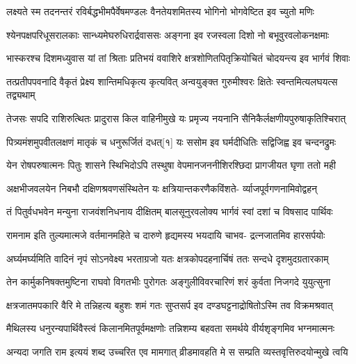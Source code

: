 \twolineshloka
{लक्ष्यते स्म तदनन्तरं रविर्बद्धभीमपैर्वेषमण्डलः}
{वैनतेयशमितस्य भोगिनो भोगवेष्टित इव च्युतो मणिः} %

\fourlineindentedshloka
{श्येनपक्षपरिधूसरालकाः}
{सान्ध्यमेघरुधिरार्द्रवाससः}
{अङ्गना इव रजस्वला दिशो}
{नो बभूवुरवलोकनक्षमाः} %

\fourlineindentedshloka
{भास्करश्च दिशमध्युवास यां}
{तां श्रिताः प्रतिभयं ववाशिरे}
{क्षत्रशोणितपितृक्रियोचितं}
{चोदयन्त्य इव भार्गवं शिवाः} %

\twolineshloka
{तत्प्रतीपपवनादि वैकृतं प्रेक्ष्य शान्तिमधिकृत्य कृत्यवित्}
{अन्वयुङ्क्त गुरुमीश्वरः क्षितेः स्वन्तमित्यलघयत्स तद्व्यथाम्} %

\twolineshloka
{तेजसः सपदि राशिरुत्थितः प्रादुरास किल वाहिनीमुखे}
{यः प्रमृज्य नयनानि सैनिकैर्लक्षणीयपुरुषाकृतिश्चिरात्} %

\twolineshloka
{पित्र्यमंशमुपवीतलक्षणं मातृकं च धनुरूर्जितं दधत्[१]}
{यः ससोम इव घर्मदीधितिः सद्विजिह्व इव चन्दनद्रुमः} %

\twolineshloka
{येन रोषपरुषात्मनः पितुः शासने स्थिभिदोऽपि तस्थुषा}
{वेपमानजननीशिरश्छिदा प्रागजीयत घृणा ततो मही} %

\fourlineindentedshloka
{अक्षभीजवलयेन निबभौ}
{दक्षिणश्रवणसंस्थितेन यः}
{क्षत्रियान्तकरणैकविंशते-}
{र्व्याजपूर्वगणनामिवोद्वहन्} %

\fourlineindentedshloka
{तं पितुर्वधभवेन मन्युना}
{राजवंशनिधनाय दीक्षितम्}
{बालसूनुरवलोक्य भार्गवं}
{स्वां दशां च विषसाद पार्थिवः} %

\fourlineindentedshloka
{रामनाम इति तुल्यमात्मजे}
{वर्तमानमहिते च दारुणे}
{हृद्यमस्य भयदायि चाभव-}
{द्रत्नजातमिव हारसर्पयोः} %

\fourlineindentedshloka
{अर्घ्यमर्घ्यमिति वादिनं नृपं}
{सोऽनवेक्ष्य भरताग्रजो यतः}
{क्षत्रकोपदहनार्चिषं ततः}
{सन्दधे दृशमुदग्रतारकाम्} %

\fourlineindentedshloka
{तेन कार्मुकनिषक्तमुष्टिना}
{राघवो विगतभीः पुरोगतः}
{अङ्गुलीविवरचारिणं शरं}
{कुर्वता निजगदे युयुत्सुना} %

\twolineshloka
{क्षत्रजातमपकारि वैरि मे तन्निहत्य बहुशः शमं गतः}
{सुप्तसर्प इव दण्डघट्टनाद्रोषितोऽस्मि तव विक्रमश्रवात्} %

\twolineshloka
{मैथिलस्य धनुरन्यपार्थिवैस्त्वं किलानमितपूर्वमक्षणोः}
{तन्निशम्य बहवता समर्थये वीर्यशृङ्गमिव भग्नमात्मनः} %

\twolineshloka
{अन्यदा जगति राम इत्ययं शब्द उच्चरित एव मामगात्}
{व्रीडमावहति मे स सम्प्रति व्यस्तवृत्तिरुदयोन्मुखे त्वयि} %

